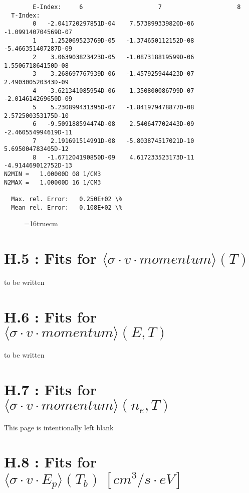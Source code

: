 \documentclass[12pt,dvipdfmx]{article}
\begin{document}
{\begin{small}
\begin{verbatim}
        E-Index:     6                     7                     8
  T-Index:
        0   -2.041720297851D-04    7.573899339820D-06   -1.099140704569D-07
        1    1.252069523769D-05   -1.374650112152D-08   -5.466351407287D-09
        2    3.063903823423D-05   -1.087318819599D-06    1.550671864150D-08
        3    3.268697767939D-06   -1.457925944423D-07    2.490300520343D-09
        4   -3.621341085954D-06    1.350800086799D-07   -2.014614269650D-09
        5    5.230899431395D-07   -1.841979478877D-08    2.572500353175D-10
        6   -9.509188594474D-08    2.540647702443D-09   -2.460554994619D-11
        7    2.191691514991D-08   -5.803874517021D-10    5.695004783405D-12
        8   -1.671204190850D-09    4.617233523173D-11   -4.914469012752D-13
N2MIN =   1.00000D 08 1/CM3
N2MAX =   1.00000D 16 1/CM3

  Max. rel. Error:   0.250E+02 \%
  Mean rel. Error:   0.108E+02 \%

\end{verbatim}\end{small}
\begin{figure} \label{2.2.17mad}
\epsfxsize=16truecm
\end{figure}
\newpage

\section{H.5 : Fits for $\langle\sigma \cdot v \cdot momentum \rangle (T) $}

to be written

\newpage

\section{H.6 : Fits for $\langle\sigma \cdot v \cdot momentum \rangle (E,T) $ }

to be written

\newpage

\section{H.7 : Fits for $\langle\sigma \cdot v \cdot momentum \rangle (n_e,T) $ }

\newpage
This page is intentionally left blank
\newpage

\section{H.8 : Fits for $\langle\sigma \cdot v \cdot E_p \rangle (T_b) \ [cm^3/s
\cdot eV]$}

}
\end{document}
